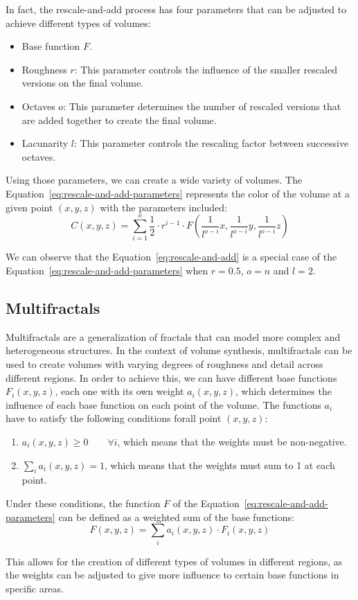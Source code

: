 In fact, the rescale-and-add process has four parameters that can be adjusted to achieve different types of volumes:
\begin{itemize}
    \item Base function $F$.
    \item Roughness $r$: This parameter controls the influence of the smaller rescaled versions on the final volume.
    \item Octaves $o$: This parameter determines the number of rescaled versions that are added together to create the final volume.
    \item Lacunarity $l$: This parameter controls the rescaling factor between successive octaves.
\end{itemize}

Using those parameters, we can create a wide variety of volumes. The Equation~\eqref{eq:rescale-and-add-parameters} represents the color of the volume at a given point $(x, y, z)$ with the parameters included:
\begin{equation}
    C(x, y, z) = \sum_{i=1}^{o} \frac{1}{2}\cdot r^{i-1} \cdot F\left( \frac{1}{l^{o-i}} x, \frac{1}{l^{o-i}} y, \frac{1}{l^{o-i}} z \right)
    \label{eq:rescale-and-add-parameters}
\end{equation}

We can observe that the Equation~\eqref{eq:rescale-and-add} is a special case of the Equation~\eqref{eq:rescale-and-add-parameters} when $r = 0.5$, $o = n$ and $l = 2$.

\subsection{Multifractals}

Multifractals are a generalization of fractals that can model more complex and heterogeneous structures. In the context of volume synthesis, multifractals can be used to create volumes with varying degrees of roughness and detail across different regions. In order to achieve this, we can have different base functions $F_i(x,y,z)$, each one with its own weight $a_i(x,y,z)$, which determines the influence of each base function on each point of the volume. The functions $a_i$ have to satisfy the following conditions forall point $(x,y,z)$:
\begin{enumerate}
    \item $a_i(x,y,z) \geq 0\qquad \forall i$, which means that the weights must be non-negative.
    \item $\sum\limits_{i} a_i(x,y,z) = 1$, which means that the weights must sum to 1 at each point.
\end{enumerate}

Under these conditions, the function $F$ of the Equation~\eqref{eq:rescale-and-add-parameters} can be defined as a weighted sum of the base functions:
\begin{equation}
    F(x,y,z) = \sum_{i} a_i(x,y,z) \cdot F_i(x,y,z)
\end{equation}

This allows for the creation of different types of volumes in different regions, as the weights can be adjusted to give more influence to certain base functions in specific areas.